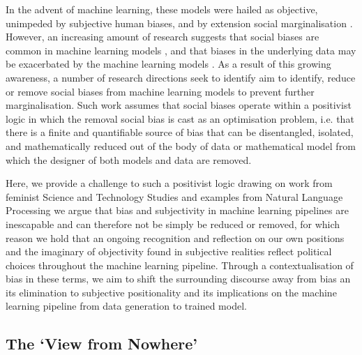 In the advent of machine learning, these models were hailed as objective, unimpeded by subjective human biases, and by extension social marginalisation \cite{Oneill:2016}. However, an increasing amount of research suggests that social biases are common in machine learning models \cite{Shah:2020,Buolamwini:2018,Agarwal:2018}, and that biases in the underlying data may be exacerbated by the machine learning models \cite{Zhao:2017,Jia:2020}. As a result of this growing awareness, a number of research directions seek to identify \cite{Shah:2020,Bender-Friedman:2018,Mitchell:2019,Buolamwini:2018} aim to identify, reduce or remove social biases \cite{Zhao:2017,Agarwal:2018,Romanov:2019,Jia:2020} from machine learning models to prevent further marginalisation. Such work assumes that social biases operate within a positivist logic in which the removal social bias is cast as an optimisation problem, i.e. that there is a finite and quantifiable source of bias that can be disentangled, isolated, and mathematically reduced out of the body of data or mathematical model from which the designer of both models and data are removed.

Here, we provide a challenge to such a positivist logic drawing on work from feminist Science and Technology Studies and examples from Natural Language Processing we argue that bias and subjectivity in machine learning pipelines are inescapable and can therefore not be simply be reduced or removed, for which reason we hold that an ongoing recognition and reflection on our own positions and the imaginary of objectivity found in subjective realities reflect political choices throughout the machine learning pipeline. Through a contextualisation of bias in these terms, we aim to shift the surrounding discourse away from bias an its elimination to subjective positionality and its implications on the machine learning pipeline from data generation to trained model.

\subsection{The `View from Nowhere'}

